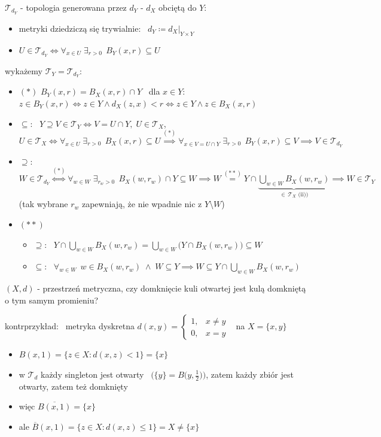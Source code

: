 \documentclass[a4paper,12pt]{article}
\begin{document}
\(\mathcal{T}_{d_Y}\) - topologia generowana przez \(d_Y\) - \(d_X\) obciętą do \(Y\):
\smallskip
\begin{itemize}
    \item metryki dziedziczą się trywialnie: \, \(d_Y \coloneqq d_X|_{Y \times Y}\)
    \item \(U \in \mathcal{T}_{d_Y} \iff \forall_{x \in U} \; \exists_{r > 0} \;\, B_Y(x, r) \subseteq U\)
\end{itemize}
\smallskip
wykażemy \(\mathcal{T}_Y = \mathcal{T}_{d_Y}\):
\begin{itemize}
    \item \((*)\) \; \(B_Y(x, r) = B_X(x, r) \cap Y\) \, dla \(x \in Y\): \, \(z \in B_Y(x, r) \iff z \in Y \land d_X(z, x) < r \iff z \in Y \land z \in B_X(x, r)\)
    \item \(\subseteq\): \, \(Y \supseteq V \in \mathcal{T}_Y \iff V = U \cap Y, \; U \in \mathcal{T}_X\), \; \(U \in \mathcal{T}_X \iff \forall_{x \in U} \; \exists_{r > 0} \;\, B_X(x, r) \subseteq U \overset{(*)}{\implies} \forall_{x \in V = U \cap Y} \; \exists_{r > 0} \;\, B_Y(x, r) \subseteq V \implies V \in \mathcal{T}_{d_Y}\)
    \item \(\supseteq\): \, \(W \in \mathcal{T}_{d_Y} \overset{(*)}{\iff} \forall_{w \in W} \; \exists_{r_w > 0} \;\, B_X(w, r_w) \cap Y \subseteq W \implies W \overset{(**)}{=} Y \cap \underbrace{\bigcup_{w \in W} B_X(w, r_w)}_{\in \, \mathcal{T}_X \text{ (ii))}} \implies W \in \mathcal{T}_Y\) \\
    (tak wybrane \(r_w\) zapewniają, że nie wpadnie nic z \(Y \setminus W\))
    \smallskip
    \item \((**)\)
    \begin{itemize}
        \item \(\supseteq\): \, \(Y \cap \bigcup_{w \in W} B_X(w, r_w) = \bigcup_{w \in W} \big(Y \cap B_X(w, r_w)\big) \subseteq W\)
        \item \(\subseteq\): \, \(\forall_{w \in W} \;\, w \in B_X(w, r_w) \;\land\; W \subseteq Y \implies W \subseteq Y \cap \bigcup_{w \in W} B_X(w, r_w)\)
    \end{itemize}
\end{itemize}

\bigskip
{} \; \((X, d)\) - przestrzeń metryczna, \; czy domknięcie kuli otwartej jest kulą domkniętą o tym samym promieniu?

\smallskip
kontrprzykład: \, metryka dyskretna \(d(x, y) = \begin{cases} 1, & x \neq y \\ 0, & x = y \end{cases}\) \, na \(X = \{x, y\}\)
\begin{itemize}
    \item \(B(x, 1) = \{z \in X : d(x, z) < 1\} = \{x\}\)
    \item w \(\mathcal{T}_d\) każdy singleton jest otwarty \, \(\big(\{y\} = B\big(y, \frac{1}{2}\big)\big)\), zatem każdy zbiór jest otwarty, zatem też domknięty
    \item więc \(\overline{B(x, 1)} = \{x\}\)
    \item ale \(\overline{B}(x, 1) = \{z \in X : d(x, z) \leq 1\} = X \neq \{x\}\)
\end{itemize}
\end{document}
